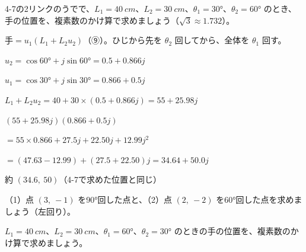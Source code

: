 \begin{reidai}[ロボットのうでの先の位置]
4-7の2リンクのうでで、$L_1=\qty{40}{cm}$、$L_2=\qty{30}{cm}$、$\theta_1=30°$、$\theta_2=60°$ のとき、手の位置を、複素数のかけ算で求めましょう（$\sqrt3\approx1.732$）。\par
\kangaekata 手$=u_1(L_1+L_2u_2)$（⑨）。ひじから先を $\theta_2$ 回してから、全体を $\theta_1$ 回す。\par
\shiki{}\zw{} $u_2=\cos60°+j\sin60°=0.5+0.866j$\par
\bkvija $u_1=\cos30°+j\sin30°=0.866+0.5j$\par
\bkvija $L_1+L_2u_2=40+30\times(0.5+0.866j)=55+25.98j$\par
\bkvija $(55+25.98j)(0.866+0.5j)$\par
\bkvija $=55\times0.866+27.5j+22.50j+12.99j^2$\par
\bkvija $=(47.63-12.99)+(27.5+22.50)j=34.64+50.0j$\par
\kotae{}\zw{} 約 $(34.6,\ 50)$（4-7で求めた位置と同じ）
\end{reidai}

\noindent\begin{minipage}[t]{0.485\linewidth}\vspace{0pt}
\begin{jibun}
（1）点 $(3,\ -1)$ を90°回した点と、（2）点 $(2,\ -2)$ を60°回した点を求めましょう（左回り）。
\end{jibun}
\end{minipage}\hfill
\begin{minipage}[t]{0.485\linewidth}\vspace{0pt}
\begin{jibun}
$L_1=\qty{40}{cm}$、$L_2=\qty{30}{cm}$、$\theta_1=60°$、$\theta_2=30°$ のときの手の位置を、複素数のかけ算で求めましょう。
\end{jibun}
\end{minipage}

